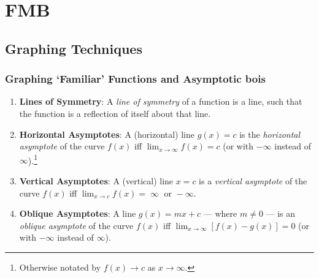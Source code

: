 \documentclass[oneside]{book}
\begin{document}

\part{FMB}
\chapter{Graphing Techniques}
\section{Graphing `Familiar' Functions and Asymptotic bois}

\begin{definition*}{}{}
  \begin{enumerate}
    \item \textbf{Lines of Symmetry}: A \emph{line of symmetry} of a function is a line, such that the function is a reflection of itself about that line.
    \item \textbf{Horizontal Asymptotes}: A (horizontal) line \(g(x)=c\) is the \emph{horizontal asymptote} of the curve \(f(x)\) iff \(\lim_{x \to \infty}{f(x)}=c\) (or with \(-\infty\) instead of \(\infty\)).\footnote{Otherwise notated by \(f(x) \to c\) as \(x \to \infty\).}
    \item \textbf{Vertical Asymptotes}: A (vertical) line \(x=c\) is a \emph{vertical asymptote} of the curve \(f(x)\) iff \(\lim_{x \to c}{f(x)}=\operatorname{\infty} \text{ or } -\infty\).
    \item \textbf{Oblique Asymptotes}: A line \(g(x)=mx+c\) --- where \(m \neq 0\) --- is an \emph{oblique asymptote} of the curve \(f(x)\) iff \(\lim_{x \to \infty}[f(x)-g(x)]=0\) (or with \(-\infty\) instead of \(\infty\)).
\end{enumerate}
\end{definition*}
\end{document}
